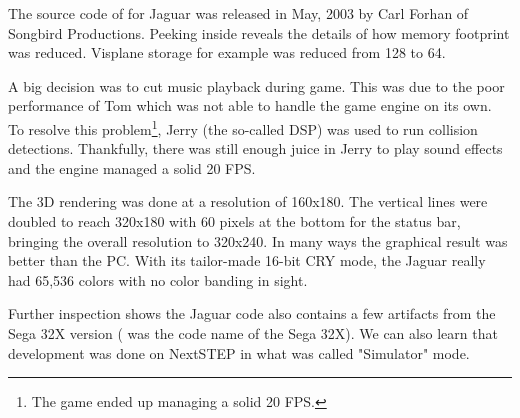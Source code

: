 \vspace{-12pt}
The source code of \doom{} for Jaguar was released in May, 2003 by Carl Forhan of Songbird Productions. Peeking inside reveals the details of how memory footprint was reduced. Visplane storage for example was reduced from 128 to 64.\\
\par
{}
\par
A big decision was to cut music playback during game. This was due to the poor performance of Tom which was not able to handle the game engine on its own. To resolve this problem\footnote{The game ended up managing a solid 20 FPS.}, Jerry (the so-called DSP) was used to run collision detections. Thankfully, there was still enough juice in Jerry to play sound effects and the engine managed a solid 20 FPS.\\
\par
The 3D rendering was done at a resolution of 160x180. The vertical lines were doubled to reach 320x180 with 60 pixels at the bottom for the status bar, bringing the overall resolution to 320x240. In many ways the graphical result was better than the PC. With its tailor-made 16-bit CRY mode, the Jaguar really had 65,536 colors with no color banding in sight.




\par
Further inspection shows the Jaguar code also contains a few artifacts from the Sega 32X version ( was the code name of the Sega 32X). We can also learn that development was done on NextSTEP in what was called "Simulator" mode.\\
\par
{}
\par

